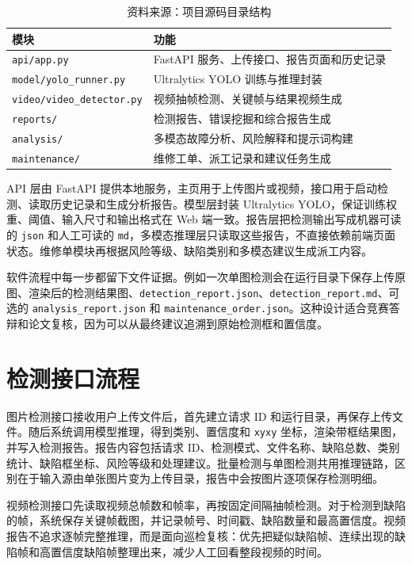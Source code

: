 \documentclass[UTF8,zihao=-4,a4paper]{ctexrep}
\newcommand{\code}[1]{\texttt{#1}}
\newcommand{\tablesource}[1]{\vspace{-0.4em}\caption*{\footnotesize 资料来源：#1}}
\begin{document}
\begin{table}[H]
  \centering
  \caption{软件模块划分}
  \label{tab:software_modules}
  \small
  \begin{tabularx}{\textwidth}{lX}
    \toprule
    模块 & 功能 \\
    \midrule
    \code{api/app.py} & FastAPI 服务、上传接口、报告页面和历史记录 \\
    \code{model/yolo\_runner.py} & Ultralytics YOLO 训练与推理封装 \\
    \code{video/video\_detector.py} & 视频抽帧检测、关键帧与结果视频生成 \\
    \code{reports/} & 检测报告、错误挖掘和综合报告生成 \\
    \code{analysis/} & 多模态故障分析、风险解释和提示词构建 \\
    \code{maintenance/} & 维修工单、派工记录和建议任务生成 \\
    \bottomrule
  \end{tabularx}
  \tablesource{项目源码目录结构}
\end{table}

API 层由 FastAPI 提供本地服务，主页用于上传图片或视频，接口用于启动检测、读取历史记录和生成分析报告。模型层封装 Ultralytics YOLO，保证训练权重、阈值、输入尺寸和输出格式在 Web 端一致。报告层把检测输出写成机器可读的 \code{json} 和人工可读的 \code{md}，多模态推理层只读取这些报告，不直接依赖前端页面状态。维修单模块再根据风险等级、缺陷类别和多模态建议生成派工内容。

软件流程中每一步都留下文件证据。例如一次单图检测会在运行目录下保存上传原图、渲染后的检测结果图、\code{detection\_report.json}、\code{detection\_report.md}、可选的 \code{analysis\_report.json} 和 \code{maintenance\_order.json}。这种设计适合竞赛答辩和论文复核，因为可以从最终建议追溯到原始检测框和置信度。

\section{检测接口流程}
图片检测接口接收用户上传文件后，首先建立请求 ID 和运行目录，再保存上传文件。随后系统调用模型推理，得到类别、置信度和 \code{xyxy} 坐标，渲染带框结果图，并写入检测报告。报告内容包括请求 ID、检测模式、文件名称、缺陷总数、类别统计、缺陷框坐标、风险等级和处理建议。批量检测与单图检测共用推理链路，区别在于输入源由单张图片变为上传目录，报告中会按图片逐项保存检测明细。

视频检测接口先读取视频总帧数和帧率，再按固定间隔抽帧检测。对于检测到缺陷的帧，系统保存关键帧截图，并记录帧号、时间戳、缺陷数量和最高置信度。视频报告不追求逐帧完整推理，而是面向巡检复核：优先把疑似缺陷帧、连续出现的缺陷帧和高置信度缺陷帧整理出来，减少人工回看整段视频的时间。
\end{document}
